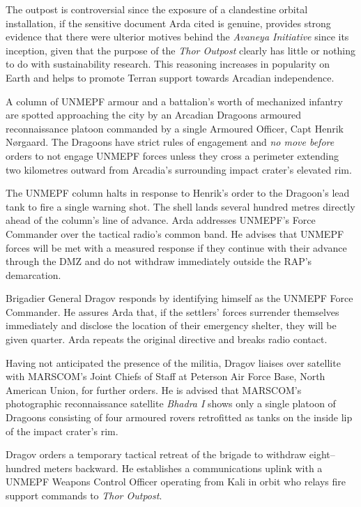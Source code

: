 The outpost is controversial since the exposure of a clandestine orbital installation, if the sensitive document Arda cited is genuine, provides strong evidence that there were ulterior motives behind the {\it Avaneya Initiative} since its inception, given that the purpose of the {\it Thor Outpost} clearly has little or nothing to do with sustainability research. This reasoning increases in popularity on Earth and helps to promote Terran support towards Arcadian independence.
\StopTimelineDate

A column of UNMEPF armour and a battalion's worth of mechanized infantry are spotted approaching the city by an Arcadian Dragoons armoured reconnaissance platoon commanded by a single Armoured Officer, Capt Henrik Nørgaard. The Dragoons have strict rules of engagement and {\it no move before} orders to not engage UNMEPF forces unless they cross a perimeter extending two kilometres outward from Arcadia's surrounding impact crater's elevated rim.

The UNMEPF column halts in response to Henrik's order to the Dragoon's lead tank to fire a single warning shot. The shell lands several hundred metres directly ahead of the column's line of advance. Arda addresses UNMEPF's Force Commander over the tactical radio's common band. He advises that UNMEPF forces will be met with a measured response if they continue with their advance through the DMZ and do not withdraw immediately outside the RAP's demarcation. 

Brigadier General Dragov responds by identifying himself as the UNMEPF Force Commander. He assures Arda that, if the settlers' forces surrender themselves immediately and disclose the location of their emergency shelter, they will be given quarter. Arda repeats the original directive and breaks radio contact.

Having not anticipated the presence of the militia, Dragov liaises over satellite with MARSCOM's Joint Chiefs of Staff at Peterson Air Force Base, North American Union, for further orders. He is advised that MARSCOM's photographic reconnaissance satellite {\it Bhadra I} shows only a single platoon of Dragoons consisting of four armoured rovers retrofitted as tanks on the inside lip of the impact crater's rim. 

Dragov orders a temporary tactical retreat of the brigade to withdraw eight--hundred meters backward. He establishes a communications uplink with a UNMEPF Weapons Control Officer operating from Kali in orbit who relays fire support commands to {\it Thor Outpost}.
\StopTimelineDate

